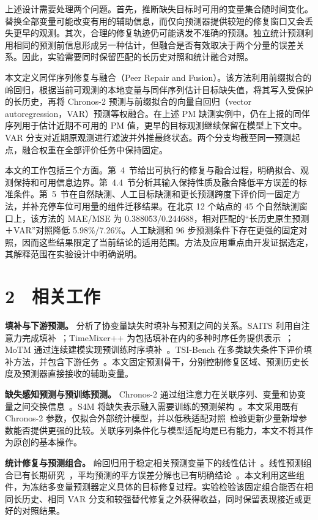 上述设计需要处理两个问题。首先，推断缺失目标时可用的变量集合随时间变化。替换全部变量可能改变有用的辅助信息，而仅向预测器提供较短的修复窗口又会丢失更早的观测。其次，合理的修复轨迹仍可能诱发不准确的预测。独立统计预测利用相同的预测前信息形成另一种估计，但融合是否有效取决于两个分量的误差关系。因此，实验需要同时保留匹配的长历史对照和统计融合对照。

本文定义同伴序列修复与融合（Peer Repair and Fusion）。该方法利用前缀拟合的岭回归，根据当前可观测的本地变量与同伴序列估计目标缺失值，将其写入受保护的长历史，再将 Chronos-2 预测与前缀拟合的向量自回归（vector autoregression，VAR）预测等权融合。在上述 PM 缺测实例中，仍在上报的同伴序列用于估计近期不可用的 PM 值，更早的目标观测继续保留在模型上下文中。VAR 分支对近期原观测进行滤波并外推最终状态。两个分支均截至同一预测起点，融合权重在全部评价任务中保持固定。

本文的工作包括三个方面。第~4~节给出可执行的修复与融合过程，明确拟合、观测保持和可用信息边界。第~4.4~节分析其输入保持性质及融合降低平方误差的标准条件。第~5~节在自然缺测、人工目标缺测和更长预测跨度下评价同一固定方法，并补充停车位可用量的组件迁移结果。在北京 12 个站点的 45 个自然缺测窗口上，该方法的 MAE/MSE 为 0.388053/0.244688，相对匹配的“长历史原生预测＋VAR”对照降低 5.98\%/7.26\%。人工缺测和 96 步预测条件下存在更强的固定对照，因而这些结果限定了当前结论的适用范围。方法及应用重点由开发证据选定，其解释范围在实验设计中明确说明。

\section{2　相关工作}


\textbf{填补与下游预测。}
\citet{lemorvan2021good} 分析了协变量缺失时填补与预测之间的关系。SAITS 利用自注意力完成填补~\citep{du2023saits}；TimeMixer++ 为包括填补在内的多种时序任务提供表示~\citep{wang2025timemixerpp}；MoTM 通过连续建模实现预训练时序填补~\citep{motmsoftware}。TSI-Bench 在多类缺失条件下评价填补方法，并包含下游任务~\citep{du2024tsibench}。本文固定预测骨干，分别控制修复区域、预测历史长度及预测器直接接收的辅助变量。

\textbf{缺失感知预测与预训练预测。}
Chronos-2 通过组注意力在关联序列、变量和协变量之间交换信息~\citep{ansari2025chronos2}。S4M 将缺失表示融入需要训练的预测架构~\citep{peng2025s4m}。本文采用既有 Chronos-2 参数，仅拟合外部统计模型，并以低秩适配对照~\citep{hu2021lora}检验更新少量新增参数能否提供更强的比较。关联序列条件化与模型适配均是已有能力，本文不将其作为原创的基本操作。

\textbf{统计修复与预测组合。}
岭回归用于稳定相关预测变量下的线性估计~\citep{hoerl1970ridge}。线性预测组合已有长期研究~\citep{bates1969combination}，平均预测的平方误差分解也已有明确结论~\citep{krogh1994ensembles}。本文利用这些组件，为冻结多变量预测器定义具体的目标修复过程。实验检验该固定组合能否在相同长历史、相同 VAR 分支和较强替代修复之外获得收益，同时保留表现接近或更好的对照结果。

